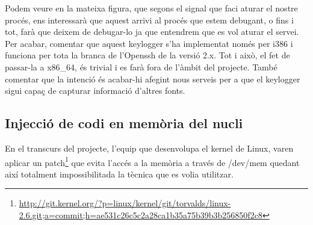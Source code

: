 Podem veure en la mateixa figura, que segons el signal que faci aturar el nostre procés, ens interessarà
que aquest arrivi al procés que estem debugant, o fins i tot, farà que deixem de debugar-lo ja que entendrem
que es vol aturar el servei. \\

Per acabar, comentar que aquest keylogger s'ha implementat només per i386 i funciona per tota la branca 
de l'Openssh de la versió 2.x. Tot i això, el fet de passar-la a x86\_64, és trivial i es farà fora de 
l'àmbit del projecte. També comentar que la intenció és acabar-hi afegint nous serveis per a que el keylogger
sigui capaç de capturar informació d'altres fonts.

\subsection{Injecció de codi en memòria del nucli}
En el transcurs del projecte, l'equip que desenvolupa el kernel de Linux, varen aplicar un 
patch\footnote{\href{Patch que evita l'ús de /dev/mem per accedir a la memòria}{http://git.kernel.org/?p=linux/kernel/git/torvalds/linux-2.6.git;a=commit;h=ae531c26c5c2a28ca1b35a75b39b3b256850f2c8}} que evita
l'accés a la memòria a través de /dev/mem quedant així totalment impossibilitada la tècnica que es volia 
utilitzar. 

